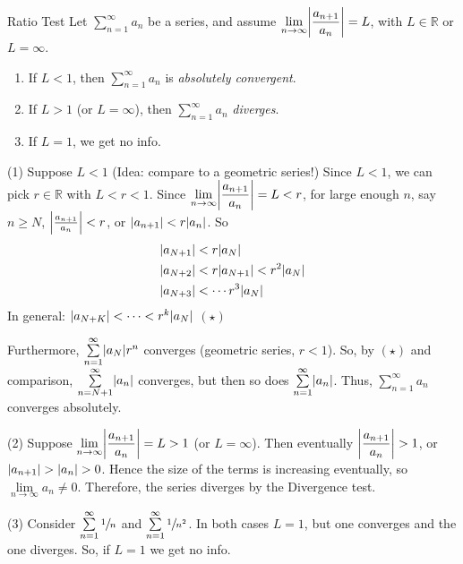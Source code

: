 \begin{Theorem}{Ratio Test}{}
    Let $ \sum\limits_{n=1}^{\infty} a_n $ be a series, and assume
    $ \displaystyle \lim\limits_{{n} \to {\infty}} \abs*{\frac{a_{n+1}}{a_n} }=L $,
    with $ L\in\mathbb{R} $ or $ L=\infty $.
    \begin{enumerate}
        \item If $ L<1 $, then $ \sum\limits_{n=1}^{\infty} a_n $ is \emph{absolutely convergent}.
        \item If $ L>1 $ (or $ L=\infty $), then $ \sum\limits_{n=1}^{\infty} a_n $
              \emph{diverges}.
        \item If $ L=1 $, we get no info.
    \end{enumerate}
\end{Theorem}
\begin{Proof}{}{}
    (1) Suppose $ L<1 $ (Idea: compare to a geometric series!)
    Since $ L<1 $, we can pick $ r\in\mathbb{R} $ with $ L<r<1 $. Since
    $ \displaystyle \lim\limits_{{n} \to {\infty}} \abs*{\frac{a_{n+1}}{a_n}}=L<r $,
    for large enough $ n $, say $ n\geqslant N $, $ \abs*{\frac{a_{n+1}}{a_n} }<r $,
    or $ \abs{a_{n+1}}<r\abs{a_n} $. So
    \begin{align*}
         & \abs{a_{N+1}}<r\abs{a_N}                  \\
         & \abs{a_{N+2}}<r\abs{a_{N+1}}<r^2\abs{a_N} \\
         & \abs{a_{N+3}}<\cdots r^3\abs{a_N}
    \end{align*}
    In general: $ \abs{a_{N+K}}<\cdots<r^k\abs{a_N} $ $ (\star) $

    Furthermore, $ \sum\limits_{n=1}^{\infty} \abs{a_N}r^n $ converges (geometric series,
    $ r<1 $). So, by $ (\star) $ and comparison, $ \sum\limits_{n=N+1}^{\infty} \abs{a_n} $
    converges, but then so does $ \sum\limits_{n=1}^{\infty} \abs{a_n} $. Thus,
    $ \sum\limits_{n=1}^{\infty} a_n $ converges absolutely.

    (2) Suppose $ \displaystyle \lim\limits_{{n} \to {\infty}} \abs*{\frac{a_{n+1}}{a_n} }=L>1 $
    (or $ L=\infty $). Then eventually $ \displaystyle \abs*{\frac{a_{n+1}}{a_n}}>1 $,
    or $ \abs{a_{n+1}}>\abs{a_n}>0 $. Hence the size of the terms is increasing eventually,
    so $ \lim\limits_{{n} \to {\infty}} a_n\neq 0 $. Therefore, the
    series diverges by the Divergence test.

    (3) Consider $ \sum\limits_{n=1}^{\infty} \sfrac{1}{n} $ and $ \sum\limits_{n=1}^{\infty}
        \sfrac{1}{n^2}  $. In both cases $ L=1 $, but one converges and the one diverges. So,
    if $ L=1 $ we get no info.
\end{Proof}

